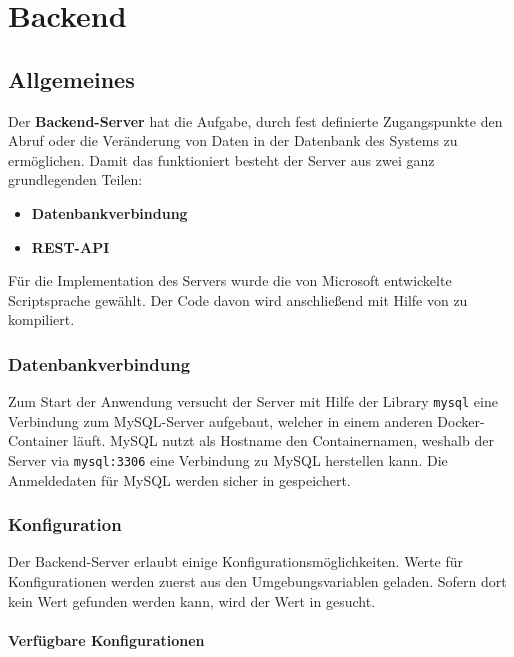 \part{Backend}
\chapter{Allgemeines}

Der \textbf{Backend-Server} hat die Aufgabe, durch fest definierte Zugangspunkte den Abruf oder die Veränderung von Daten in der Datenbank des Systems zu ermöglichen. Damit das funktioniert besteht der Server aus zwei ganz grundlegenden Teilen:

\begin{itemize}
    \item \textbf{Datenbankverbindung}
    \item \textbf{REST-API}
\end{itemize}

Für die Implementation des Servers wurde die von Microsoft entwickelte Scriptsprache \textit{} gewählt. Der Code davon wird anschließend mit Hilfe von \textit{} zu \textit{} kompiliert.

\section{Datenbankverbindung}

Zum Start der Anwendung versucht der Server mit Hilfe der Library \lstinline{mysql} eine Verbindung zum MySQL-Server aufgebaut, welcher in einem anderen Docker-Container läuft. MySQL nutzt als Hostname den Containernamen, weshalb der Server via \lstinline{mysql:3306} eine Verbindung zu MySQL herstellen kann. Die Anmeldedaten für MySQL werden sicher in \textit{} gespeichert.

\section{Konfiguration}

Der Backend-Server erlaubt einige Konfigurationsmöglichkeiten. Werte für Konfigurationen werden zuerst aus den Umgebungsvariablen geladen. Sofern dort kein Wert gefunden werden kann, wird der Wert in \textit{} gesucht.

\subsection{Verfügbare Konfigurationen}

